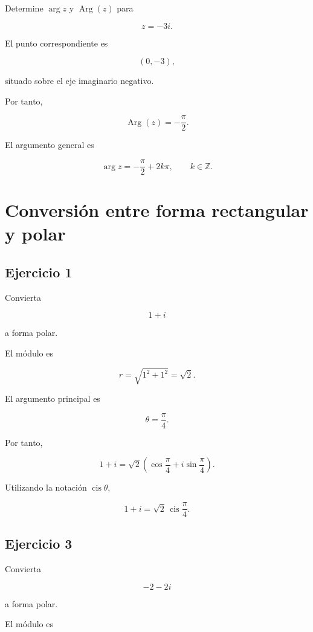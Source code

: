 \documentclass[12pt]{article}
\begin{document}
Determine \(\arg z\) y \(\operatorname{Arg}(z)\) para

\[
z=-3i.
\]

El punto correspondiente es

\[
(0,-3),
\]

situado sobre el eje imaginario negativo.

Por tanto,

\[
\operatorname{Arg}(z)
=
-\frac{\pi}{2}.
\]

El argumento general es

\[
\boxed{
\arg z
=
-\frac{\pi}{2}+2k\pi,
\qquad k\in\mathbb{Z}
}.
\]

\section*{Conversión entre forma rectangular y polar}

\subsection*{Ejercicio 1}

Convierta

\[
1+i
\]

a forma polar.

El módulo es

\[
r
=
\sqrt{1^2+1^2}
=
\sqrt2.
\]

El argumento principal es

\[
\theta=\frac{\pi}{4}.
\]

Por tanto,

\[
\boxed{
1+i
=
\sqrt2
\left(
\cos\frac{\pi}{4}
+i\sin\frac{\pi}{4}
\right)
}.
\]

Utilizando la notación \(\operatorname{cis}\theta\),

\[
\boxed{
1+i=\sqrt2\,\operatorname{cis}\frac{\pi}{4}
}.
\]


\subsection*{Ejercicio 3}

Convierta

\[
-2-2i
\]

a forma polar.

El módulo es
\end{document}
